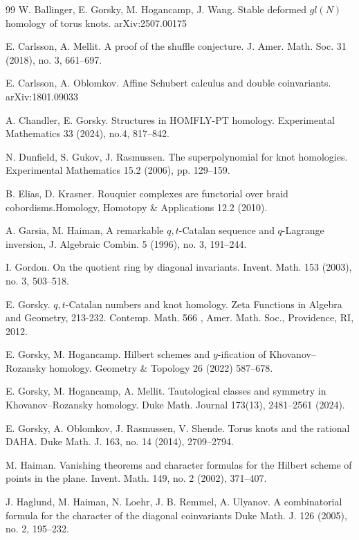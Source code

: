 \documentclass{amsart}
\numberwithin{equation}{section}
\theoremstyle{definition}
\begin{document}
\begin{thebibliography}{99}
 W. Ballinger, E. Gorsky, M. Hogancamp, J. Wang. Stable deformed $gl(N)$ homology of torus knots. arXiv:2507.00175 

 E. Carlsson, A. Mellit. A proof of the shuffle conjecture.
J. Amer. Math. Soc. 31 (2018), no. 3, 661--697.

 E. Carlsson, A. Oblomkov.  
Affine Schubert calculus and double coinvariants. arXiv:1801.09033 

 

 A. Chandler, E. Gorsky. Structures in HOMFLY-PT homology.
Experimental Mathematics 33 (2024), no.4, 817--842.

 N. Dunfield, S. Gukov, J. Rasmussen. The superpolynomial for knot
homologies. Experimental Mathematics 15.2 (2006), pp. 129--159.

 B. Elias, D. Krasner.  Rouquier complexes are functorial over braid cobordisms.Homology, Homotopy \& Applications 12.2 (2010).

 A. Garsia, M. Haiman, A remarkable $q, t$-Catalan sequence and $q$-Lagrange inversion,
J. Algebraic Combin. 5 (1996), no. 3, 191--244.

 I. Gordon. On the quotient ring by diagonal invariants.
Invent. Math. 153 (2003), no. 3, 503--518.

 E. Gorsky. $q,t$-Catalan numbers and knot homology. Zeta Functions in Algebra and Geometry, 213-232.
Contemp. Math. 566 , Amer. Math. Soc., Providence, RI, 2012.

 E. Gorsky, M. Hogancamp. Hilbert schemes and $y$-ification of Khovanov--Rozansky homology.
Geometry \& Topology 26 (2022) 587--678.

 E. Gorsky, M. Hogancamp, A. Mellit. Tautological classes and symmetry in Khovanov--Rozansky homology.
Duke Math. Journal 173(13), 2481--2561 (2024).

  E. Gorsky, A. Oblomkov, J. Rasmussen, V. Shende. Torus knots and the rational DAHA. Duke Math. J. 163, no. 14 (2014), 2709--2794.

 M. Haiman. Vanishing theorems and character formulas for the Hilbert scheme of points in the plane. Invent. Math. 149, no. 2 (2002), 371--407.

 J. Haglund, M. Haiman, N.  Loehr, J. B.  Remmel, A. Ulyanov. A combinatorial formula for the character of the diagonal coinvariants
Duke Math. J. 126 (2005), no. 2, 195--232.


\end{thebibliography}
\end{document}

